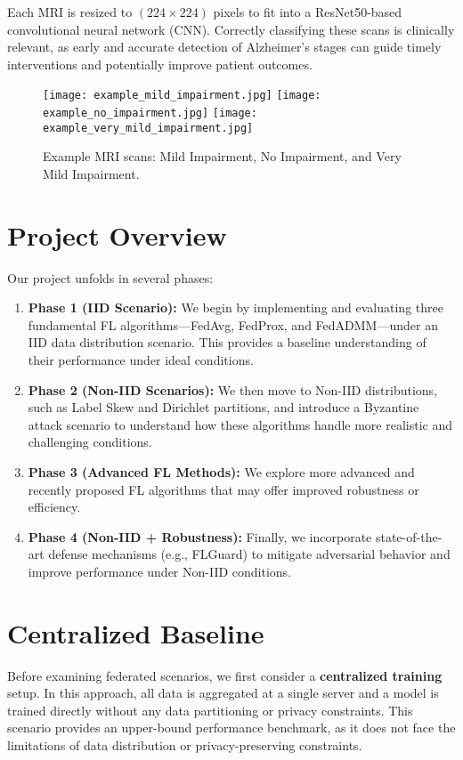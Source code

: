 \documentclass[12pt,a4paper]{report}
\begin{document}
Each MRI is resized to $(224 \times 224)$ pixels to fit into a ResNet50-based convolutional neural network (CNN). Correctly classifying these scans is clinically relevant, as early and accurate detection of Alzheimer’s stages can guide timely interventions and potentially improve patient outcomes.

\begin{figure}[H]
	\centering
	\texttt{[image: example\_mild\_impairment.jpg]}
	\texttt{[image: example\_no\_impairment.jpg]}
	\texttt{[image: example\_very\_mild\_impairment.jpg]}
	\caption{Example MRI scans: Mild Impairment, No Impairment, and Very Mild Impairment.}
	\label{fig:dataset_examples}
\end{figure}

\section{Project Overview}

Our project unfolds in several phases:

\begin{enumerate}
	\item \textbf{Phase 1 (IID Scenario):} We begin by implementing and evaluating three fundamental FL algorithms—FedAvg, FedProx, and FedADMM—under an IID data distribution scenario. This provides a baseline understanding of their performance under ideal conditions.
	\item \textbf{Phase 2 (Non-IID Scenarios):} We then move to Non-IID distributions, such as Label Skew and Dirichlet partitions, and introduce a Byzantine attack scenario to understand how these algorithms handle more realistic and challenging conditions.
	\item \textbf{Phase 3 (Advanced FL Methods):} We explore more advanced and recently proposed FL algorithms that may offer improved robustness or efficiency.
	\item \textbf{Phase 4 (Non-IID + Robustness):} Finally, we incorporate state-of-the-art defense mechanisms (e.g., FLGuard) to mitigate adversarial behavior and improve performance under Non-IID conditions.
\end{enumerate}

\section{Centralized Baseline}

Before examining federated scenarios, we first consider a \textbf{centralized training} setup. In this approach, all data is aggregated at a single server and a model is trained directly without any data partitioning or privacy constraints. This scenario provides an upper-bound performance benchmark, as it does not face the limitations of data distribution or privacy-preserving constraints.
\end{document}
